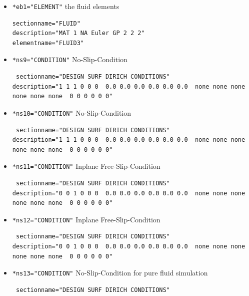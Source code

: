 \begin{itemize}
 \item \verb|*eb1="ELEMENT"| \qquad the fluid elements
 \begin{small} \begin{verbatim}
sectionname="FLUID"
description="MAT 1 NA Euler GP 2 2 2"
elementname="FLUID3"
\end{verbatim} \end{small}


 \item \verb|*ns9="CONDITION"| \qquad No-Slip-Condition
\begin{small} \begin{verbatim} sectionname="DESIGN SURF DIRICH CONDITIONS"
description="1 1 1 0 0 0  0.0 0.0 0.0 0.0 0.0 0.0  none none none none none none  0 0 0 0 0 0"
\end{verbatim} \end{small} \item \verb|*ns10="CONDITION"| \qquad No-Slip-Condition
\begin{small} \begin{verbatim} sectionname="DESIGN SURF DIRICH CONDITIONS"
description="1 1 1 0 0 0  0.0 0.0 0.0 0.0 0.0 0.0  none none none none none none  0 0 0 0 0 0"
\end{verbatim} \end{small} \item \verb|*ns11="CONDITION"| \qquad Inplane Free-Slip-Condition
\begin{small} \begin{verbatim} sectionname="DESIGN SURF DIRICH CONDITIONS"
description="0 0 1 0 0 0  0.0 0.0 0.0 0.0 0.0 0.0  none none none none none none  0 0 0 0 0 0"
\end{verbatim} \end{small} \item \verb|*ns12="CONDITION"| \qquad Inplane Free-Slip-Condition
\begin{small} \begin{verbatim} sectionname="DESIGN SURF DIRICH CONDITIONS"
description="0 0 1 0 0 0  0.0 0.0 0.0 0.0 0.0 0.0  none none none none none none  0 0 0 0 0 0"
\end{verbatim} \end{small} \item \verb|*ns13="CONDITION"| \qquad No-Slip-Condition for pure fluid simulation
\begin{small} \begin{verbatim} sectionname="DESIGN SURF DIRICH CONDITIONS"

\end{verbatim}
\end{small}
\end{itemize}

